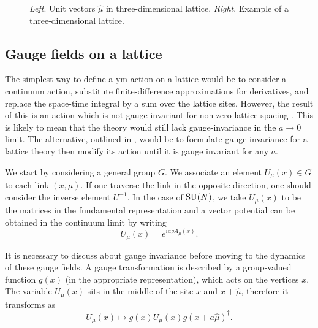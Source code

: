 \begin{figure}[t]
    \centering
    
    \caption[three-dimensional lattice]{
        \emph{Left}. Unit vectors $\hat{\mu}$ in three-dimensional lattice.
        \emph{Right}. Example of a three-dimensional lattice.
    }
\end{figure}

%
%
\subsection{Gauge fields on a lattice}
\label{sub:gauge_fields_on_a_lattice}

The simplest way to define a \ac{ym} action on a lattice would be to consider a continuum action, substitute finite-difference approximations for derivatives, and replace the space-time integral by a sum over the lattice sites.
However, the result of this is an action which is not-gauge invariant for non-zero lattice spacing \cite{wilson1974confinement}.
This is likely to mean that the theory would still lack gauge-invariance in the $a \to 0$ limit.
The alternative, outlined in \cite{wilson1974confinement, creutz1985book}, would be to formulate gauge invariance for a lattice theory then modify its action until it is gauge invariant for any $a$.

We start by considering a general group $G$.
We associate an element $U_{\mu}(x) \in G$ to each link $(x, \mu)$.
If one traverse the link in the opposite direction, one should consider the inverse element $U^{-1}$.
In the case of $\text{SU}(N)$, we take $U_{\mu}(x)$ to be the matrices in the fundamental representation and a vector potential can be obtained in the continuum limit by writing
\begin{equation}
    U_{\mu}(x) = e^{i a g A_{\mu}(x)}.
\end{equation}


It is necessary to discuss about gauge invariance before moving to the dynamics of these gauge fields.
A gauge transformation is described by a group-valued function $g(x)$ (in the appropriate representation), which acts on the vertices $x$.
The variable $U_{\mu}(x)$ sits in the middle of the site $x$ and $x + \hat{\mu}$, therefore it transforms as
\begin{equation}
    U_{\mu}(x) \mapsto g(x) U_{\mu}(x) g(x + a \hat{\mu})^{\dagger}
    \label{eq:gauge_transf_field_lattice}.
\end{equation}

